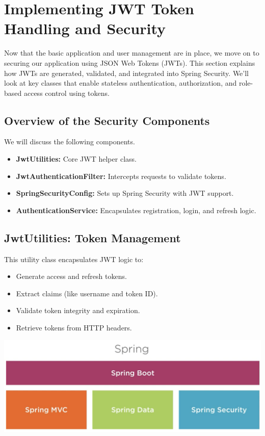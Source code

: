 \section{Implementing JWT Token Handling and Security}

Now that the basic application and user management are in place, we move on to securing our application using JSON Web Tokens (JWTs). This section explains how JWTs are generated, validated, and integrated into Spring Security. We'll look at key classes that enable stateless authentication, authorization, and role-based access control using tokens.

\subsection*{Overview of the Security Components}

We will discuss the following components.

\begin{itemize}
\item \textbf{JwtUtilities:} Core JWT helper class.
\item \textbf{JwtAuthenticationFilter:} Intercepts requests to validate tokens.
\item \textbf{SpringSecurityConfig:} Sets up Spring Security with JWT support.
\item \textbf{AuthenticationService:} Encapsulates registration, login, and refresh logic.
\end{itemize}

\subsection*{JwtUtilities: Token Management}

This utility class encapsulates JWT logic to:

\begin{itemize}
\item Generate access and refresh tokens.
\item Extract claims (like username and token ID).
\item Validate token integrity and expiration.
\item Retrieve tokens from HTTP headers.
\end{itemize}


\includegraphics{./images/security/spring_boot.png}

